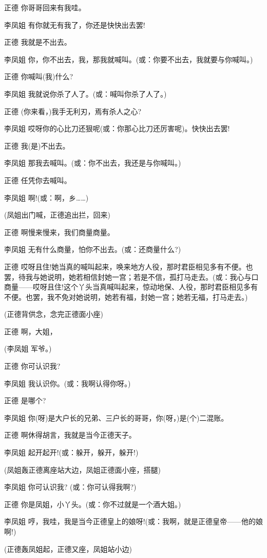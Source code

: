 正德 你哥哥回来有我哇。

李凤姐 有你就无有我了，你还是快快出去罢!

正德 我就是不出去。

李凤姐 你，你不出去，我，那我就喊叫。(或：你要不出去，我就要与你喊叫。)

正德 你喊叫(我)什么?

李凤姐 我就说你杀了人了。(或：喊叫你杀了人了。)

正德 (你来看，)我手无利刃，焉有杀人之心?

李凤姐 哎呀你的心比刀还狠呢(或：你那心比刀还厉害呢)。快快出去罢!

正德 我(是)不出去。

李凤姐 那我去喊叫。(或：你不出去，我还是与你喊叫。)

正德 任凭你去喊叫。

李凤姐 啊!(或：啊，乡\ldots{}\ldots{})

(凤姐出门喊，正德追出拦，回来)

正德 啊慢来慢来，我们商量商量。

李凤姐 无有什么商量，怕你不出去。(或：还商量什么?)

正德
哎呀且住!她当真的喊叫起来，唤来地方人役，那时君臣相见多有不便。也罢，待我与她说明，她若相信封她一宫；若是不信，孤打马走去。(或：我心与口商量------哎呀且住!这个丫头当真喊叫起来，惊动地保、人役，那时君臣相见多有不便。也罢，我不免对她说明，她若有福，封她一宫；她若无福，打马走去。)

(正德背供念，念完正德面小座)

正德 啊，大姐，

(李凤姐 军爷。)

正德 你可认识我?

李凤姐 我认识你。(或：我啊认得你呀。)

正德 是哪个?

李凤姐 你(呀)是大户长的兄弟、三户长的哥哥，你(呀，)是(个)二混账。

正德 啊休得胡言，我就是当今正德天子。

李凤姐 起开起开!(或：躲开，躲开，躲开!)

(凤姐轰正德离座站大边，凤姐正德面小座，搭腿)

李凤姐 你可认识我? (或：你可认得我啊?)

正德 你是凤姐，小丫头。(或：你不过就是一个酒大姐。)

李凤姐
哼，我哇，我是当今正德皇上的娘呀!(或：我啊，就是正德皇帝------他的娘啊!)

(正德轰凤姐起，正德又座，凤姐站小边)

